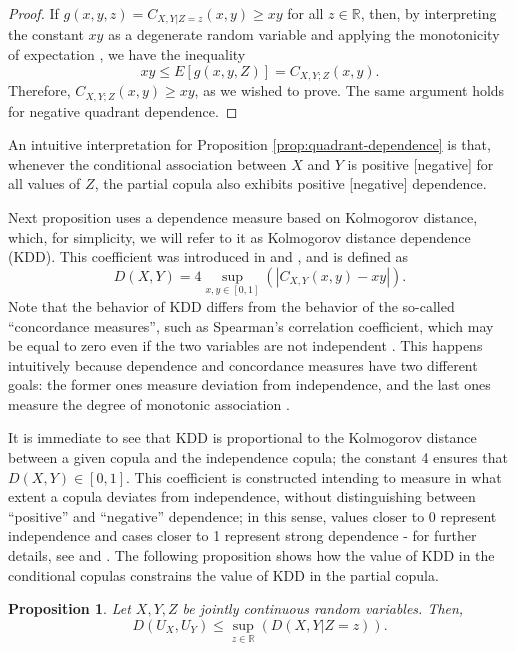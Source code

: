 \documentclass[
]{article}
\newtheorem{proposition}{Proposition}
\begin{document}
\begin{proof}
If $g(x, y, z) = C_{X,Y|Z=z}(x, y) \geq xy$ for all $z \in \mathbb{R}$, then, by interpreting the constant $xy$ as a degenerate random variable and applying the monotonicity of expectation \citep[property E2 of section 3.3 of][]{james1981}, we have the inequality
$$xy \leq E[g(x, y, Z)] = C_{X,Y;Z}(x, y).$$
Therefore, $C_{X,Y;Z}(x, y) \geq xy$, as we wished to prove. The same argument holds for negative quadrant dependence.
\end{proof}

An intuitive interpretation for Proposition
\ref{prop:quadrant-dependence} is that, whenever the conditional
association between \(X\) and \(Y\) is positive {[}negative{]} for all
values of \(Z\), the partial copula also exhibits positive
{[}negative{]} dependence.

Next proposition uses a dependence measure based on Kolmogorov distance,
which, for simplicity, we will refer to it as Kolmogorov distance
dependence (KDD). This coefficient was introduced in \citet{wolff1977}
and \citet{schweizer1981}, and is defined as
\[D(X, Y) = 4 \sup_{x,y \in [0,1]} (|C_{X,Y}(x, y) - xy|).\] Note that
the behavior of KDD differs from the behavior of the so-called
``concordance measures'', such as Spearman's correlation coefficient,
which may be equal to zero even if the two variables are not independent
\citep{garciaportugues2025}. This happens intuitively because dependence
and concordance measures have two different goals: the former ones
measure deviation from independence, and the last ones measure the
degree of monotonic association \citep[see][]{nelsen2006, joe2014}.

It is immediate to see that KDD is proportional to the Kolmogorov
distance between a given copula and the independence copula; the
constant 4 ensures that \(D(X, Y) \in [0, 1]\). This coefficient is
constructed intending to measure in what extent a copula deviates from
independence, without distinguishing between ``positive'' and
``negative'' dependence; in this sense, values closer to 0 represent
independence and cases closer to 1 represent strong dependence - for
further details, see \citet{wolff1977} and \citet{schweizer1981}. The
following proposition shows how the value of KDD in the conditional
copulas constrains the value of KDD in the partial copula.

\begin{proposition}\label{prop:partial-copula-independence}
Let $X, Y, Z$ be jointly continuous random variables. Then,
$$D(U_X, U_Y) \leq \sup_{z \in \mathbb{R}} (D(X, Y | Z = z)).$$
\end{proposition}
\end{document}
